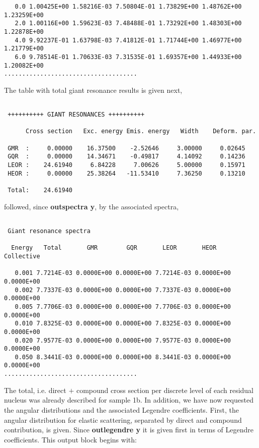\begin{samplecase}
{\begin{verbatim}
   0.0 1.00425E+00 1.58216E-03 7.50804E-01 1.73829E+00 1.48762E+00 1.23259E+00 
   2.0 1.00116E+00 1.59623E-03 7.48488E-01 1.73292E+00 1.48303E+00 1.22878E+00 
   4.0 9.92237E-01 1.63798E-03 7.41812E-01 1.71744E+00 1.46977E+00 1.21779E+00 
   6.0 9.78514E-01 1.70633E-03 7.31535E-01 1.69357E+00 1.44933E+00 1.20082E+00 
.....................................
\end{verbatim} } \renewcommand{\baselinestretch}{1.07}\small\normalsize
\noindent
The table with total giant resonance results is given next,

{\small \begin{verbatim}

 ++++++++++ GIANT RESONANCES ++++++++++

      Cross section   Exc. energy Emis. energy   Width    Deform. par.

 GMR  :     0.00000    16.37500    -2.52646     3.00000     0.02645
 GQR  :     0.00000    14.34671    -0.49817     4.14092     0.14236
 LEOR :    24.61940     6.84228     7.00626     5.00000     0.15971
 HEOR :     0.00000    25.38264   -11.53410     7.36250     0.13210

 Total:    24.61940
\end{verbatim} } \renewcommand{\baselinestretch}{1.07}\small\normalsize
\noindent
followed, since {\bf outspectra y}, by the associated spectra,

{\small \begin{verbatim}

 Giant resonance spectra

  Energy   Total       GMR        GQR       LEOR       HEOR     Collective

   0.001 7.7214E-03 0.0000E+00 0.0000E+00 7.7214E-03 0.0000E+00 0.0000E+00
   0.002 7.7337E-03 0.0000E+00 0.0000E+00 7.7337E-03 0.0000E+00 0.0000E+00
   0.005 7.7706E-03 0.0000E+00 0.0000E+00 7.7706E-03 0.0000E+00 0.0000E+00
   0.010 7.8325E-03 0.0000E+00 0.0000E+00 7.8325E-03 0.0000E+00 0.0000E+00
   0.020 7.9577E-03 0.0000E+00 0.0000E+00 7.9577E-03 0.0000E+00 0.0000E+00
   0.050 8.3441E-03 0.0000E+00 0.0000E+00 8.3441E-03 0.0000E+00 0.0000E+00
.....................................
\end{verbatim} } \renewcommand{\baselinestretch}{1.07}\small\normalsize
\noindent
The total, i.e. direct $+$ compound cross section per discrete level of 
each residual nucleus was already described for sample 1b. In addition, we have
now requested the angular distributions and the associated Legendre 
coefficients. 
First, the angular distribution for elastic scattering, separated by direct and 
compound contribution, is given. Since {\bf outlegendre y} it is given first in 
terms of Legendre coefficients. This output block begins with:


\end{samplecase}
